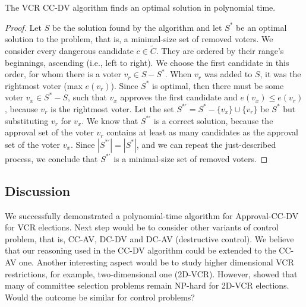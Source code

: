 \begin{proposition}
    The VCR CC-DV algorithm finds an optimal solution in polynomial time.
    \begin{proof}
        Let $S$ be the solution found by the algorithm
        and let $S^{*}$ be an optimal solution to the problem, that is, a minimal-size set of removed voters.
        We consider every dangerous candidate $c \in \widetilde{C}$. They are ordered by their range's beginnings, ascending (i.e., left to right).
        We choose the first candidate in this order, for whom there is a voter $v_r \in S - S^*$.
        When $v_r$ was added to $S$, it was the rightmost voter (max $e(v_r)$).
        Since $S^*$ is optimal, then there must be some voter $v_x \in S^* - S$,
        such that $v_x$ approves the first candidate and $e(v_x) \leq e(v_r)$, because $v_r$ is the rightmost voter.
        Let the set $S^{*\prime} = S^* - \{v_x\} \cup \{v_r\}$ be $S^{*}$ but substituting $v_r$ for $v_x$.
        We know that $S^{*\prime}$ is a correct solution, 
        because the approval set of the voter $v_r$ contains at least as many candidates as the approval set of the voter $v_x$.
        Since $|S^{*\prime}| = |S^{*}|$, and we can repeat the just-described process,
        we conclude that $S^{*\prime}$ is a minimal-size set of removed voters.
    \end{proof}
\end{proposition}

\subsection{Discussion}
We successfully demonstrated a polynomial-time algorithm for Approval-CC-DV for VCR elections.
Next step would be to consider other variants of control problem, that is, CC-AV, DC-DV and DC-AV (destructive control).
We believe that our reasoning used in the CC-DV algorithm could be extended to the CC-AV one.
Another interesting aspect would be to study higher dimensional VCR restrictions, for example, two-dimensional one (2D-VCR).
However, \cite{faliszewski-vcr} showed that many of committee selection problems remain NP-hard for 2D-VCR elections.
Would the outcome be similar for control problems?
